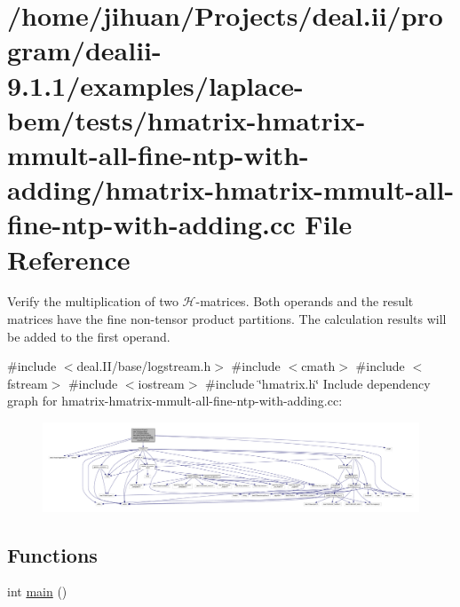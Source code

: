\hypertarget{hmatrix-hmatrix-mmult-all-fine-ntp-with-adding_8cc}{}\section{/home/jihuan/\+Projects/deal.ii/program/dealii-\/9.1.1/examples/laplace-\/bem/tests/hmatrix-\/hmatrix-\/mmult-\/all-\/fine-\/ntp-\/with-\/adding/hmatrix-\/hmatrix-\/mmult-\/all-\/fine-\/ntp-\/with-\/adding.cc File Reference}
\label{hmatrix-hmatrix-mmult-all-fine-ntp-with-adding_8cc}


Verify the multiplication of two $\mathcal{H}$-\/matrices. Both operands and the result matrices have the fine non-\/tensor product partitions. The calculation results will be added to the first operand.  


{\ttfamily \#include $<$deal.\+I\+I/base/logstream.\+h$>$}\newline
{\ttfamily \#include $<$cmath$>$}\newline
{\ttfamily \#include $<$fstream$>$}\newline
{\ttfamily \#include $<$iostream$>$}\newline
{\ttfamily \#include \char`\"{}hmatrix.\+h\char`\"{}}\newline
Include dependency graph for hmatrix-\/hmatrix-\/mmult-\/all-\/fine-\/ntp-\/with-\/adding.cc\+:\nopagebreak
\begin{figure}[H]
\begin{center}
\leavevmode
\includegraphics[width=350pt]{hmatrix-hmatrix-mmult-all-fine-ntp-with-adding_8cc__incl}
\end{center}
\end{figure}
\subsection*{Functions}
\begin{DoxyCompactItemize}
\item 
int \hyperlink{hmatrix-hmatrix-mmult-all-fine-ntp-with-adding_8cc_ae66f6b31b5ad750f1fe042a706a4e3d4}{main} ()
\end{DoxyCompactItemize}


